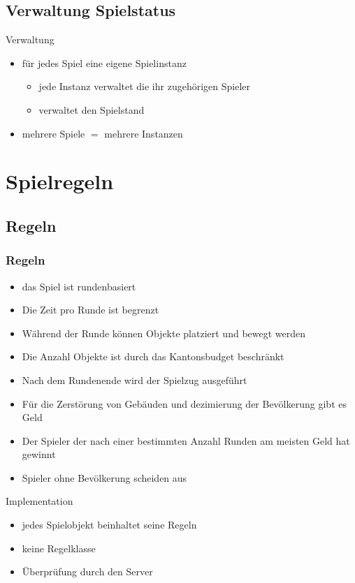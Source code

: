 \documentclass[12pt, utf8]{beamer}
\begin{document}
\subsection{Verwaltung Spielstatus}
\begin{frame}{Verwaltung}
	\begin{itemize}
		\item für jedes Spiel eine eigene Spielinstanz
			\begin{itemize}
		\item jede Instanz verwaltet die ihr zugehörigen Spieler
		\item verwaltet den Spielstand
			\end{itemize}
		\item mehrere Spiele $=$ mehrere Instanzen
	\end{itemize}
\end{frame}

\section{Spielregeln}
\subsection{Regeln}
\begin{frame}[allowframebreaks]
	\frametitle{Regeln}
	\begin{itemize}
\item das Spiel ist rundenbasiert
\item Die Zeit pro Runde ist begrenzt
\item Während der Runde können Objekte platziert und bewegt werden
\item Die Anzahl Objekte ist durch das Kantonsbudget beschränkt
\item Nach dem Rundenende wird der Spielzug ausgeführt
\item Für die Zerstörung von Gebäuden und dezimierung der Bevölkerung gibt es Geld
\item Der Spieler der nach einer bestimmten Anzahl Runden am meisten Geld hat gewinnt
\item Spieler ohne Bevölkerung scheiden aus
\end{itemize}
	\begin{exampleblock}{Implementation}
		\begin{itemize}
\item jedes Spielobjekt beinhaltet seine Regeln
\item keine Regelklasse
\item Überprüfung durch den Server
\end{itemize}
\end{exampleblock}
\end{frame}
\end{document}
